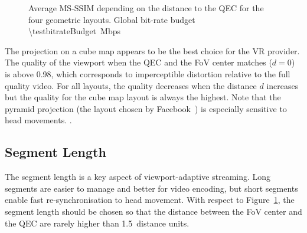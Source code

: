 \begin{figure}
    
       \caption{Average \acs{MS-SSIM} depending on the distance to the \acs{QEC} for the four geometric layouts. Global bit-rate budget \SI{\testbitrateBudget}{\mega bps}}
    \label{fig:dist_quality}
\end{figure}

The projection on a cube map appears to be the best choice for the
\ac{VR} provider. The quality of the viewport when the \ac{QEC} and
the \ac{FoV} center matches ($d=0$) is above \num{0.98}, which
corresponds to imperceptible distortion relative to the full quality
video. For all layouts, the quality decreases when the distance $d$
increases but the quality for the cube map layout is always the
highest. Note that the pyramid projection (the layout chosen
by Facebook~\cite{facebook}) is especially sensitive to head movements.
.

\subsection{Segment Length}
\label{subsec:segmentLength}

The segment length is a key aspect of viewport-adaptive streaming.
Long segments are easier to manage and better for video encoding, but
short segments enable fast re-synchronisation to head movement. With
respect to Figure~\ref{fig:dist_quality}, the segment length
should be chosen so that the distance between the \ac{FoV} center and
the \ac{QEC} are rarely higher than \num{1.5}~distance units.

